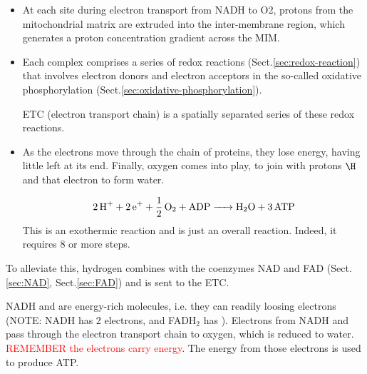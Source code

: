\begin{itemize}
  \item  At each site during electron transport from NADH to O2,
protons from the mitochondrial matrix are extruded into the
inter-membrane region, which generates a proton concentration gradient
across the MIM.

   \item Each complex comprises a series of redox reactions
(Sect.\ref{sec:redox-reaction}) that involves electron donors and electron
acceptors in the so-called oxidative phosphorylation
(Sect.\ref{sec:oxidative-phosphorylation}).

ETC (electron transport chain) is a spatially separated series of these redox
reactions.

  \item As the electrons move through the chain of proteins, they lose energy, having
little left at its end. Finally, oxygen comes into play, to join with protons
$\H$ and that electron to form water.

\begin{equation}
  \label{eq:7}
  \ce{2 H+ + 2 e+ + 1/2 O2 + ADP -> H2O + 3 ATP}
\end{equation}
This is an exothermic reaction and is just an overall
reaction. Indeed, it requires 8 or more steps.
\end{itemize}


To alleviate this, hydrogen combines with the coenzymes NAD and
FAD (Sect.\ref{sec:NAD}, Sect.\ref{sec:FAD}) and is sent to the ETC.


%

\begin{mdframed}
NADH and  are energy-rich molecules, i.e. they can readily loosing
electrons (NOTE: NADH has 2 electrons, and FADH$_2$ has ). Electrons from NADH
and  pass through the electron transport chain to oxygen, which is reduced to
water.
\textcolor{red}{REMEMBER the electrons carry energy}. The energy from those
electrons is used to produce ATP.

\end{mdframed}

